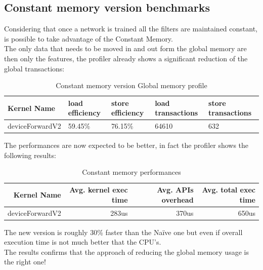 \documentclass[a4paper]{report}
\begin{document}
\subsection{Constant memory version benchmarks}
Considering that once a network is trained all the filters are maintained constant, is possible to take advantage of the Constant Memory.\\
The only data that needs to be moved in and out form the global memory are then only the features, the profiler already shows a significant reduction of the global transactions:

\begin{table}[!h]
\centering
\begin{tabular}{|l|l|l|l|l|}
\hline
\textbf{Kernel Name} & \textbf{load efficiency} & \textbf{store efficiency} & \textbf{load transactions} & \textbf{store transactions} \\ \hline
deviceForwardV2           & 59.45\%           & 76.15\%           & 64610           & 632       \\ \hline
\end{tabular}
\vspace*{3mm}
\caption{Constant memory version Global memory profile}
\label{table:t3}
\end{table}

The performances are now expected to be better, in fact the profiler shows the following results:

\begin{table}[!h]
\centering
\begin{tabular}{|r|r|r|r|}
\hline
\textbf{Kernel Name} & \textbf{Avg. kernel exec time} & \textbf{Avg. APIs overhead} & \textbf{Avg. total exec time} \\ \hline
deviceForwardV2           & 283us          & 370us   & 650us\\ \hline
\end{tabular}
\vspace*{3mm}
\caption{Constant memory  performances}
\label{table:t4}
\end{table}

The new version is roughly 30\% faster than the Naïve one but even if overall execution time is not much better that the CPU's.\\ 
The results confirms that the approach of reducing the global memory usage is the right one!\\
\end{document}
